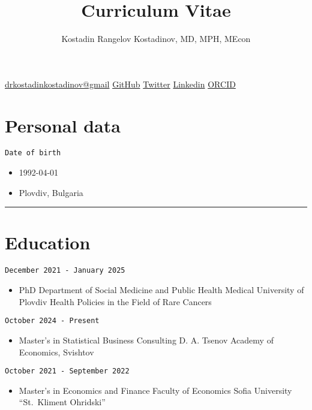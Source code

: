 \documentclass[
  12pt,
  letterpaper,
  DIV=11,
  numbers=noendperiod]{scrartcl}
\title{Curriculum Vitae}
\author{Kostadin Rangelov Kostadinov, MD, MPH, MEcon}
\date{}
\providecommand{\tightlist}{%
  \setlength{\itemsep}{0pt}\setlength{\parskip}{0pt}}\usepackage{longtable,booktabs,array}
\begin{document}
\maketitle


\href{https://drkostadinkostadinov@gmail.com}{drkostadinkostadinov@gmail}
\textbar{} \href{https://github.com/kostadinoff}{GitHub} \textbar{}
\href{https://twitter.com/kostadinoffMD}{Twitter} \textbar{}
\href{https://linkedin.com/in/kostadinovmd}{Linkedin} \textbar{}
\href{https://orcid.org/0000-0003-1414-8738}{ORCID}

\section{Personal data}\label{personal-data}

\texttt{Date\ of\ birth}

\begin{itemize}
\tightlist
\item
  1992-04-01
\item
  Plovdiv, Bulgaria
\end{itemize}

\begin{center}\rule{0.5\linewidth}{0.5pt}\end{center}

\section{Education}\label{education}

\texttt{December\ 2021\ -\ January\ 2025}

\begin{itemize}
\tightlist
\item
  PhD \textbar{} Department of Social Medicine and Public Health
  \textbar{} Medical University of Plovdiv \textbar{} Health Policies in
  the Field of Rare Cancers
\end{itemize}

\texttt{October\ 2024\ -\ Present}

\begin{itemize}
\tightlist
\item
  Master's in Statistical Business Consulting \textbar{} D. A. Tsenov
  Academy of Economics, Svishtov
\end{itemize}

\texttt{October\ 2021\ -\ September\ 2022}

\begin{itemize}
\tightlist
\item
  Master's in Economics and Finance \textbar{} Faculty of Economics
  \textbar{} Sofia University ``St.~Kliment Ohridski''
\end{itemize}
\end{document}
